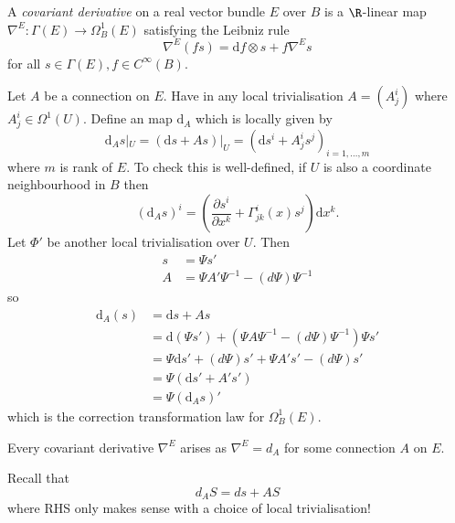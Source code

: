 \documentclass[a4paper]{article}
\begin{document}
\begin{definition}
  A \emph{covariant derivative} on a real vector bundle \(E\) over \(B\) is a \(\R\)-linear map \(\nabla^E: \Gamma(E) \to \Omega^1_B(E)\) satisfying the Leibniz rule
  \[
    \nabla^E(fs) = \mathrm df \otimes s + f \nabla^E s
  \]
  for all \(s \in \Gamma(E), f \in C^\infty(B)\).
\end{definition}

\begin{eg}
  Let \(A\) be a connection on \(E\). Have in any local trivialisation \(A = (A_j^i)\) where \(A_j^i \in \Omega^1(U)\). Define an map \(\mathrm d_A\) which is locally given by
  \[
    \mathrm d_A s|_U = (\mathrm ds + As)|_U = (\mathrm ds^i + A_j^i s^j)_{i = 1, \dots, m}
  \]
  where \(m\) is rank of \(E\). To check this is well-defined, if \(U\) is also a coordinate neighbourhood in \(B\) then
  \[
    (\mathrm d_A s)^i = \left( \frac{\partial s^i}{\partial x^k} + \Gamma_{jk}^i(x) s^j \right) \mathrm dx^k.
  \]
  Let \(\Phi'\) be another local trivialisation over \(U\). Then
  \begin{align*}
    s &= \Psi s' \\
    A &= \Psi A' \Psi^{-1} - (d\Psi) \Psi^{-1}
  \end{align*}
  so
  \begin{align*}
    \mathrm d_A(s)
    &= \mathrm d s + As \\
    &= \mathrm d(\Psi s') + (\Psi A \Psi^{-1} - (d \Psi) \Psi^{-1}) \Psi s' \\
    &= \Psi \mathrm ds' + (d\Psi) s' + \Psi A' s' - (d\Psi) s' \\
    &= \Psi(\mathrm d s' + A's') \\
    &= \Psi(\mathrm d_A s)'
  \end{align*}
  which is the correction transformation law for \(\Omega^1_B(E)\).
\end{eg}

\begin{theorem}
  Every covariant derivative \(\nabla^E\) arises as \(\nabla^E = d_A\) for some connection \(A\) on \(E\).
\end{theorem}

Recall that
\[
  d_AS = ds + AS
\]
where RHS only makes sense with a choice of local trivialisation!
\end{document}
